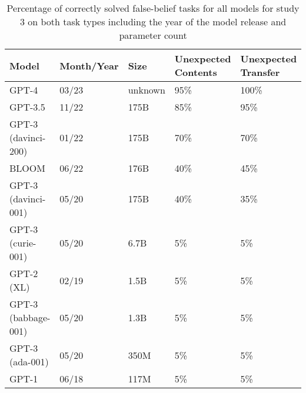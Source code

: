 \begin{table}
\caption{Percentage of correctly solved false-belief tasks for all models for study 3 on both task types including the year of the model release and parameter count \cite{kosinski}}\label{study3}
\begin{tabular}{|l|l|l|l|l|}
\hline
Model &  Month/Year & Size & Unexpected Contents& Unexpected Transfer\\
\hline
GPT-4 & 03/23 & unknown & 95\% & 100\%\\
GPT-3.5 & 11/22 & 175B & 85\% & 95\%\\
GPT-3 (davinci-200) & 01/22 & 175B & 70\% & 70\%\\
BLOOM & 06/22 & 176B & 40\% & 45\%\\
GPT-3 (davinci-001) & 05/20 & 175B & 40\% & 35\%\\
GPT-3 (curie-001) & 05/20 & 6.7B & 5\% & 5\%\\
GPT-2 (XL) & 02/19 & 1.5B & 5\% & 5\%\\
GPT-3 (babbage-001) & 05/20 & 1.3B & 5\% & 5\%\\
GPT-3 (ada-001) & 05/20 & 350M & 5\% & 5\%\\
GPT-1 & 06/18 & 117M & 5\% & 5\%\\
\hline
\end{tabular}
\end{table}
